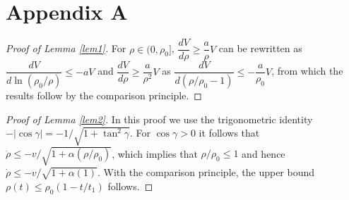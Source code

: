\documentclass[letterpaper, 10 pt, conference]{ieeeconf}  %
\begin{document}



\appendix
\section{Appendix A}
\label{appA}

\begin{proof}[Proof of Lemma \ref{lem1}]
For $\rho\in(0, \rho_0]$, $\dfrac{dV}{d\rho} \geq \dfrac{a}{\rho}V$ can be rewritten as $\dfrac{dV}{d\ln(\rho_0/\rho)}\leq -aV$ and $\dfrac{dV}{d\rho} \geq \dfrac{a}{\rho^2}V$ as $\dfrac{dV}{d(\rho/\rho_0-1)} \leq - \dfrac{a}{\rho_0}V$, from which the results follow by the comparison principle.
\end{proof}

\begin{proof}[Proof of Lemma \ref{lem2}]
In this proof we use the trigonometric identity $-|\cos\gamma| = - 1/\sqrt{1+\tan^2\gamma}$. For $\cos\gamma>0$ it follows that $\dot\rho\leq - v/\sqrt{1+\alpha(\rho/\rho_0)}$, which implies that $\rho/\rho_0\leq 1$ and hence $\dot\rho\leq - v/\sqrt{1+\alpha(1)}$. With the comparison principle, the upper bound $\rho(t)\leq \rho_0(1-t/t_1)$ follows. 
\end{proof}
\end{document}
